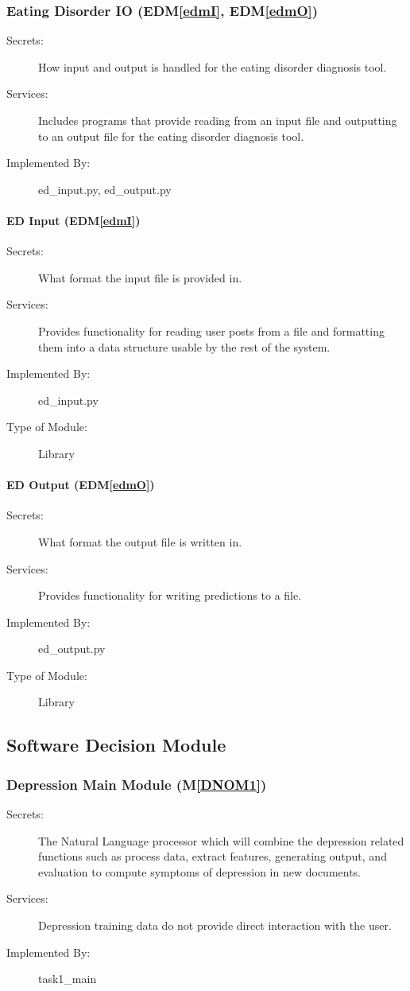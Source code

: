 \documentclass[12pt, titlepage]{article}
\newcommand{\mref}[1]{M\ref{#1}}
\newcommand{\edmref}[1]{EDM\ref{#1}}
\begin{document}
\subsubsection{Eating Disorder IO (\edmref{edmI}, \edmref{edmO})}
\begin{description}
\item[Secrets:]How input and output is handled for the eating disorder diagnosis tool.
\item[Services:]Includes programs that provide reading from an input file and outputting to an output file for the eating disorder diagnosis tool.
\item[Implemented By:] ed\_input.py, ed\_output.py
\end{description}

\paragraph{ED Input (\edmref{edmI})}
\begin{description}
\item[Secrets:]What format the input file is provided in.
\item[Services:] Provides functionality for reading user posts from a file and formatting them into a data structure usable by the rest of the system.
\item[Implemented By:] ed\_input.py
\item[Type of Module:] Library
\end{description}

\paragraph{ED Output (\edmref{edmO})}
\begin{description}
\item[Secrets:]What format the output file is written in.
\item[Services:] Provides functionality for writing predictions to a file.
\item[Implemented By:] ed\_output.py
\item[Type of Module:] Library
\end{description}

\subsection{Software Decision Module}
\subsubsection{Depression Main Module (\mref{DNOM1})}
\begin{description}
\item[Secrets:]The Natural Language processor which will combine the depression related functions such as process data, extract features, generating output, and evaluation to compute symptoms of depression in new documents.
\item[Services:] Depression training data do not provide direct interaction with the user. 
\item[Implemented By:] task1\_main
\end{description}
\end{document}
